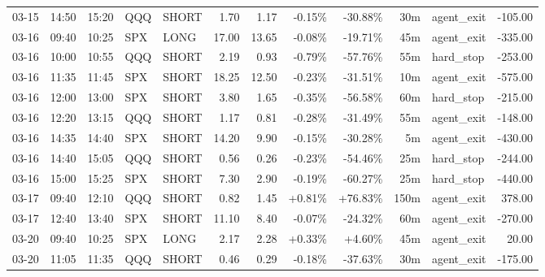 \documentclass[11pt,a4paper,twoside]{article}
\begin{document}
\begin{center}
\begin{longtable}{>{\color{txtmain}}l l l l l r r r r r >{\color{txtmain}}l r}
03-15 & 14:50 & 15:20 & QQQ & SHORT & 1.70 & 1.17 & \textcolor{lossred}{-0.15\%} & \textcolor{lossred}{-30.88\%} & 30m & agent\_exit & \textcolor{lossred}{-105.00} \\
03-16 & 09:40 & 10:25 & SPX & LONG & 17.00 & 13.65 & \textcolor{lossred}{-0.08\%} & \textcolor{lossred}{-19.71\%} & 45m & agent\_exit & \textcolor{lossred}{-335.00} \\
03-16 & 10:00 & 10:55 & QQQ & SHORT & 2.19 & 0.93 & \textcolor{lossred}{-0.79\%} & \textcolor{lossred}{-57.76\%} & 55m & hard\_stop & \textcolor{lossred}{-253.00} \\
03-16 & 11:35 & 11:45 & SPX & SHORT & 18.25 & 12.50 & \textcolor{lossred}{-0.23\%} & \textcolor{lossred}{-31.51\%} & 10m & agent\_exit & \textcolor{lossred}{-575.00} \\
03-16 & 12:00 & 13:00 & SPX & SHORT & 3.80 & 1.65 & \textcolor{lossred}{-0.35\%} & \textcolor{lossred}{-56.58\%} & 60m & hard\_stop & \textcolor{lossred}{-215.00} \\
03-16 & 12:20 & 13:15 & QQQ & SHORT & 1.17 & 0.81 & \textcolor{lossred}{-0.28\%} & \textcolor{lossred}{-31.49\%} & 55m & agent\_exit & \textcolor{lossred}{-148.00} \\
03-16 & 14:35 & 14:40 & SPX & SHORT & 14.20 & 9.90 & \textcolor{lossred}{-0.15\%} & \textcolor{lossred}{-30.28\%} & 5m & agent\_exit & \textcolor{lossred}{-430.00} \\
03-16 & 14:40 & 15:05 & QQQ & SHORT & 0.56 & 0.26 & \textcolor{lossred}{-0.23\%} & \textcolor{lossred}{-54.46\%} & 25m & hard\_stop & \textcolor{lossred}{-244.00} \\
03-16 & 15:00 & 15:25 & SPX & SHORT & 7.30 & 2.90 & \textcolor{lossred}{-0.19\%} & \textcolor{lossred}{-60.27\%} & 25m & hard\_stop & \textcolor{lossred}{-440.00} \\
03-17 & 09:40 & 12:10 & QQQ & SHORT & 0.82 & 1.45 & \textcolor{wingreen}{+0.81\%} & \textcolor{wingreen}{+76.83\%} & 150m & agent\_exit & \textcolor{wingreen}{378.00} \\
03-17 & 12:40 & 13:40 & SPX & SHORT & 11.10 & 8.40 & \textcolor{lossred}{-0.07\%} & \textcolor{lossred}{-24.32\%} & 60m & agent\_exit & \textcolor{lossred}{-270.00} \\
03-20 & 09:40 & 10:25 & SPX & LONG & 2.17 & 2.28 & \textcolor{wingreen}{+0.33\%} & \textcolor{wingreen}{+4.60\%} & 45m & agent\_exit & \textcolor{wingreen}{20.00} \\
03-20 & 11:05 & 11:35 & QQQ & SHORT & 0.46 & 0.29 & \textcolor{lossred}{-0.18\%} & \textcolor{lossred}{-37.63\%} & 30m & agent\_exit & \textcolor{lossred}{-175.00} \\

\end{longtable}
\end{center}
\end{document}
